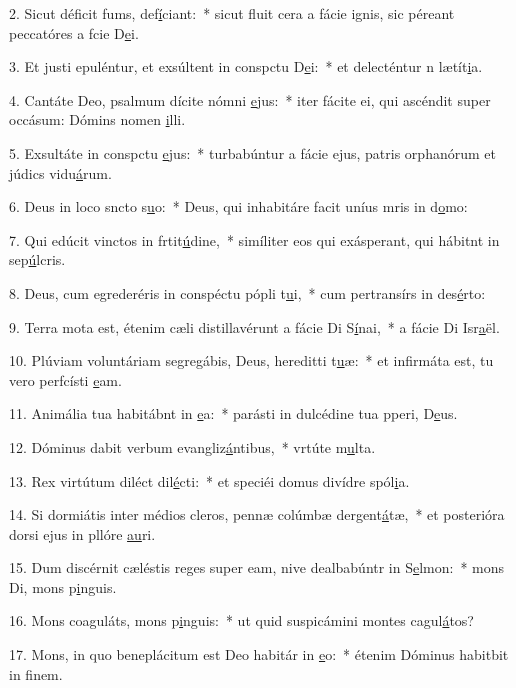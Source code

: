 2. Sicut déficit fums, def\uline{í}ciant:~* sicut fluit cera a fácie ignis, sic péreant peccatóres a fcie D\uline{e}i.\par 
3. Et justi epuléntur, et exsúltent in conspctu D\uline{e}i:~* et delecténtur n lætít\uline{i}a.\par 
4. Cantáte Deo, psalmum dícite nómni \uline{e}jus:~* iter fácite ei, qui ascéndit super occásum: Dómins nomen \uline{i}lli.\par 
5. Exsultáte in conspctu \uline{e}jus:~* turbabúntur a fácie ejus, patris orphanórum et júdics vidu\uline{á}rum.\par 
6. Deus in loco sncto s\uline{u}o:~* Deus, qui inhabitáre facit uníus mris in d\uline{o}mo:\par 
7. Qui edúcit vinctos in frtit\uline{ú}dine,~* simíliter eos qui exásperant, qui hábitnt in sep\uline{ú}lcris.\par 
8. Deus, cum egrederéris in conspéctu pópli t\uline{u}i,~* cum pertransírs in des\uline{é}rto:\par 
9. Terra mota est, étenim cæli distillavérunt a fácie Di S\uline{í}nai,~* a fácie Di Isr\uline{a}ël.\par 
10. Plúviam voluntáriam segregábis, Deus, hereditti t\uline{u}æ:~* et infirmáta est, tu vero perfcísti \uline{e}am.\par 
11. Animália tua habitábnt in \uline{e}a:~* parásti in dulcédine tua pperi, D\uline{e}us.\par 
12. Dóminus dabit verbum evangliz\uline{á}ntibus,~* vrtúte m\uline{u}lta.\par 
13. Rex virtútum diléct dil\uline{é}cti:~* et speciéi domus divídre spól\uline{i}a.\par 
14. Si dormiátis inter médios cleros, pennæ colúmbæ dergent\uline{á}tæ,~* et posterióra dorsi ejus in pllóre \uline{au}ri.\par 
15. Dum discérnit cæléstis reges super eam, nive dealbabúntr in S\uline{e}lmon:~* mons Di, mons p\uline{i}nguis.\par 
16. Mons coaguláts, mons p\uline{i}nguis:~* ut quid suspicámini montes cagul\uline{á}tos?\par 
17. Mons, in quo beneplácitum est Deo habitár in \uline{e}o:~* étenim Dóminus habitbit in f\uline{i}nem.\par 

